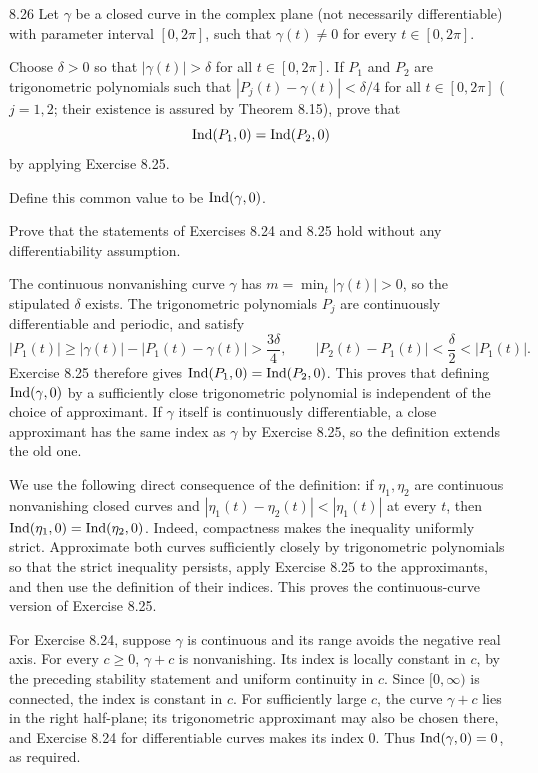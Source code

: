 \documentclass[11pt, oneside]{article}
\begin{document}
\begin{exercise}{8.26}
Let $\gamma$ be a closed curve in the complex plane (not necessarily differentiable) with parameter interval $[0, 2\pi]$, such that $\gamma(t)\ne0$ for every $t\in[0, 2\pi]$.

Choose $\delta>0$ so that $|\gamma(t)|>\delta$ for all $t\in[0, 2\pi]$. If $P_1$ and $P_2$ are trigonometric polynomials such that $|P_j(t)-\gamma(t)|<\delta/4$ for all $t\in[0, 2\pi]$ ($j=1, 2$; their existence is assured by Theorem 8.15), prove that
\[
 \operatorname{Ind}(P_1, 0)=\operatorname{Ind}(P_2, 0)
\]
by applying Exercise 8.25.

Define this common value to be $\operatorname{Ind}(\gamma, 0)$.

Prove that the statements of Exercises 8.24 and 8.25 hold without any differentiability assumption.
\end{exercise}
\begin{solution}
The continuous nonvanishing curve $\gamma$ has $m=\min_t|\gamma(t)|>0$, so the stipulated $\delta$ exists. The trigonometric polynomials $P_j$ are continuously differentiable and periodic, and satisfy
\[
 |P_1(t)|\ge|\gamma(t)|-|P_1(t)-\gamma(t)|>\frac{3\delta}4,
 \qquad |P_2(t)-P_1(t)|<\frac\delta2<|P_1(t)|.
\]
Exercise 8.25 therefore gives $\operatorname{Ind}(P_1, 0)=\operatorname{Ind}(P_2, 0)$. This proves that defining $\operatorname{Ind}(\gamma, 0)$ by a sufficiently close trigonometric polynomial is independent of the choice of approximant. If $\gamma$ itself is continuously differentiable, a close approximant has the same index as $\gamma$ by Exercise 8.25, so the definition extends the old one.

We use the following direct consequence of the definition: if $\eta_1, \eta_2$ are continuous nonvanishing closed curves and
$|\eta_1(t)-\eta_2(t)|<|\eta_1(t)|$ at every $t$, then
$\operatorname{Ind}(\eta_1, 0)=\operatorname{Ind}(\eta_2, 0)$. Indeed, compactness makes the inequality uniformly strict. Approximate both curves sufficiently closely by trigonometric polynomials so that the strict inequality persists, apply Exercise 8.25 to the approximants, and then use the definition of their indices. This proves the continuous-curve version of Exercise 8.25.

For Exercise 8.24, suppose $\gamma$ is continuous and its range avoids the negative real axis. For every $c\ge0$, $\gamma+c$ is nonvanishing. Its index is locally constant in $c$, by the preceding stability statement and uniform continuity in $c$. Since $[0, \infty)$ is connected, the index is constant in $c$. For sufficiently large $c$, the curve $\gamma+c$ lies in the right half-plane; its trigonometric approximant may also be chosen there, and Exercise 8.24 for differentiable curves makes its index $0$. Thus $\operatorname{Ind}(\gamma, 0)=0$, as required.
\end{solution}
\end{document}
